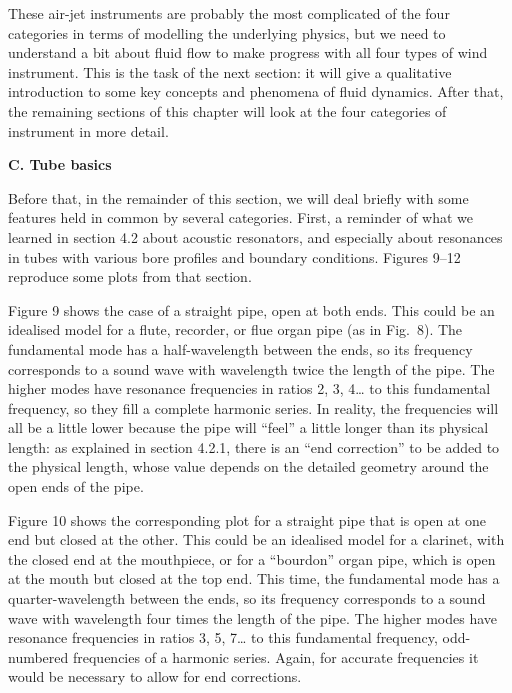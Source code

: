   These air-jet instruments are probably the most complicated of the four 
  categories in terms of modelling the underlying physics, but we need to 
  understand a bit about fluid flow to make progress with all four types of 
  wind instrument. This is the task of the next section: it will give a 
  qualitative introduction to some key concepts and phenomena of fluid 
  dynamics. After that, the remaining sections of this chapter will look at the 
  four categories of instrument in more detail. 

  \textbf{C. Tube basics} 

  Before that, in the remainder of this section, we will deal briefly with some 
  features held in common by several categories. First, a reminder of what we 
  learned in section 4.2 about acoustic resonators, and especially about 
  resonances in tubes with various bore profiles and boundary conditions. 
  Figures 9--12 reproduce some plots from that section. 

  Figure 9 shows the case of a straight pipe, open at both ends. This could be 
  an idealised model for a flute, recorder, or flue organ pipe (as in Fig.\ 8). 
  The fundamental mode has a half-wavelength between the ends, so its frequency 
  corresponds to a sound wave with wavelength twice the length of the pipe. The 
  higher modes have resonance frequencies in ratios 2, 3, 4… to this 
  fundamental frequency, so they fill a complete harmonic series. In reality, 
  the frequencies will all be a little lower because the pipe will “feel” a 
  little longer than its physical length: as explained in section 4.2.1, there 
  is an “end correction” to be added to the physical length, whose value 
  depends on the detailed geometry around the open ends of the pipe. 


  Figure 10 shows the corresponding plot for a straight pipe that is open at 
  one end but closed at the other. This could be an idealised model for a 
  clarinet, with the closed end at the mouthpiece, or for a “bourdon” organ 
  pipe, which is open at the mouth but closed at the top end. This time, the 
  fundamental mode has a quarter-wavelength between the ends, so its frequency 
  corresponds to a sound wave with wavelength four times the length of the 
  pipe. The higher modes have resonance frequencies in ratios 3, 5, 7… to this 
  fundamental frequency, odd-numbered frequencies of a harmonic series. Again, 
  for accurate frequencies it would be necessary to allow for end corrections. 

